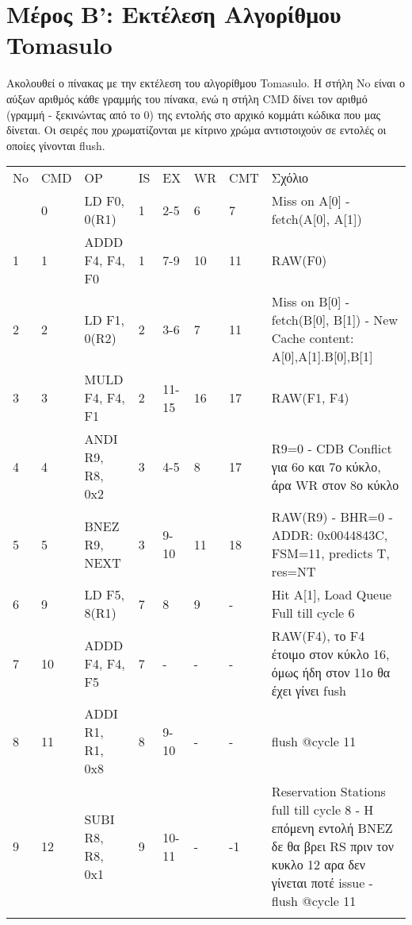 \section{Μέρος Β': Εκτέλεση Αλγορίθμου Tomasulo}
Ακολουθεί ο πίνακας με την εκτέλεση του αλγορίθμου Tomasulo. Η στήλη No είναι ο αύξων 
αριθμός κάθε γραμμής του πίνακα, ενώ η στήλη CMD δίνει τον αριθμό (γραμμή - ξεκινώντας από το 0) της
εντολής στο αρχικό κομμάτι κώδικα που μας δίνεται.
Οι σειρές που χρωματίζονται με κίτρινο χρώμα αντιστοιχούν σε εντολές οι 
οποίες γίνονται flush.

\begin{table}
  \centering
  \begin{tabular}{|l|p{0.8cm}|l|l|l|l|l|p{6.2cm}|}
    \Xhline{3\arrayrulewidth} \Xhline{3\arrayrulewidth}
      No & CMD& OP & IS & EX & WR & CMT & Σχόλιο \\ \Xhline{3\arrayrulewidth}
      \midrule
      0 & 0 & LD F0, 0(R1) & 1 & 2-5 & 6 & 7 & Miss on A[0]  - fetch(A[0], A[1]) \\ \Xhline{3\arrayrulewidth}
      1 & 1 & ADDD F4, F4, F0 & 1 & 7-9 & 10 & 11 & RAW(F0) \\ \Xhline{3\arrayrulewidth}
      2 & 2 & LD F1, 0(R2) & 2 & 3-6 & 7 & 11 & Miss on B[0] - fetch(B[0], B[1]) - New Cache content: A[0],A[1].B[0],B[1] \\ \Xhline{3\arrayrulewidth}
      3 & 3 & MULD F4, F4, F1 & 2 & 11-15 & 16 & 17 & RAW(F1, F4) \\ \Xhline{3\arrayrulewidth}
      4 & 4 & ANDI R9, R8, 0x2 & 3 & 4-5 & 8 & 17 & R9=0 -  CDB Conflict για 6ο και 7ο κύκλο, άρα WR στον 8ο κύκλο \\ \Xhline{3\arrayrulewidth}
      5 & 5 & BNEZ R9, NEXT & 3 & 9-10 & 11 & 18 &  RAW(R9) - ΒΗR=0 - ADDR: 0x0044843C,  FSM=11, predicts T, res=NT \\ \Xhline{3\arrayrulewidth}
      \rowcolor{yellow}
      6 & 9 & LD F5, 8(R1) & 7 & 8 & 9 & - & Hit A[1], Load Queue Full till cycle 6 \\ \Xhline{3\arrayrulewidth}
      \rowcolor{yellow}
      7 & 10 & ADDD F4, F4, F5 & 7 & - & - & - & RAW(F4), το F4 έτοιμο στον κύκλο 16, όμως ήδη στον 11ο θα έχει γίνει fush \\ \Xhline{3\arrayrulewidth}
      \rowcolor{yellow}
      8 & 11 & ADDI R1, R1, 0x8 & 8 & 9-10 & - & - & flush @cycle 11 \\ \Xhline{3\arrayrulewidth}
      \rowcolor{yellow}
      9 & 12 & SUBI R8, R8, 0x1 & 9 & 10-11 & - & -1 & Reservation Stations full till cycle 8 - Η επόμενη εντολή BNEZ δε θα βρει RS πριν τον κυκλο 12 αρα δεν γίνεται ποτέ issue -  flush @cycle 11 \\ \Xhline{3\arrayrulewidth}

\end{tabular}
\end{table}
